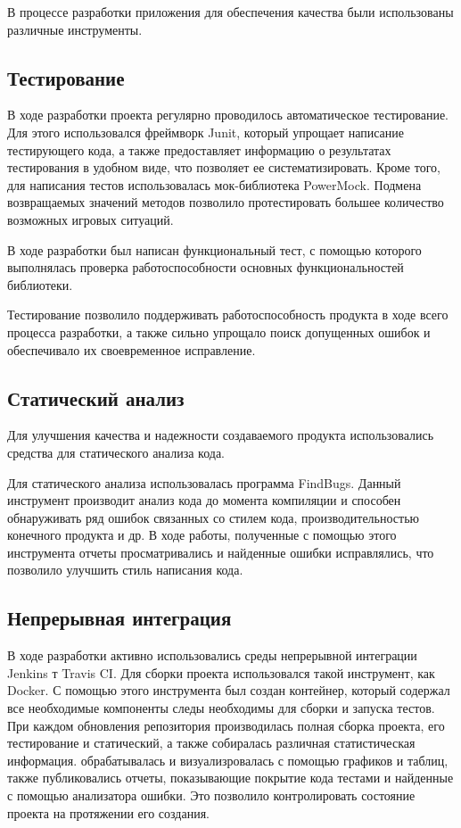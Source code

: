 В процессе разработки приложения для обеспечения качества были использованы различные инструменты.

\subsection{Тестирование}

В ходе разработки проекта регулярно проводилось автоматическое тестирование. Для этого использовался фреймворк Junit, который упрощает написание тестирующего кода, а также предоставляет информацию о результатах тестирования в удобном виде, что позволяет ее систематизировать. Кроме того, для написания тестов использовалась мок-библиотека PowerMock. Подмена возвращаемых значений методов позволило протестировать большее количество возможных игровых ситуаций.  

В ходе разработки был написан функциональный тест, с помощью которого выполнялась проверка работоспособности основных функциональностей библиотеки.

Тестирование позволило поддерживать работоспособность продукта в ходе всего процесса разработки, а также сильно упрощало поиск допущенных ошибок и обеспечивало их своевременное исправление.   

\subsection{Статический анализ}

Для улучшения качества и надежности создаваемого продукта использовались средства для статического анализа кода.

Для статического анализа использовалась программа FindBugs. Данный инструмент производит анализ кода до момента компиляции и способен обнаруживать ряд ошибок связанных со стилем кода, производительностью конечного продукта и др. В ходе работы, полученные с помощью этого инструмента отчеты просматривались и найденные ошибки исправлялись, что позволило улучшить стиль написания кода.

\subsection{Непрерывная интеграция}

В ходе разработки активно использовались среды непрерывной интеграции Jenkins т Travis CI. Для сборки проекта использовался такой инструмент, как Docker. С помощью этого инструмента был создан контейнер, который содержал все необходимые компоненты следы необходимы для сборки и запуска тестов. При каждом обновления репозитория производилась полная сборка проекта, его тестирование и статический, а также собиралась различная статистическая информация. обрабатывалась и визуализровалась с помощью графиков и таблиц, также публиковались отчеты, показывающие покрытие кода тестами и найденные с помощью анализатора ошибки. Это позволило контролировать состояние проекта на протяжении его создания.  
